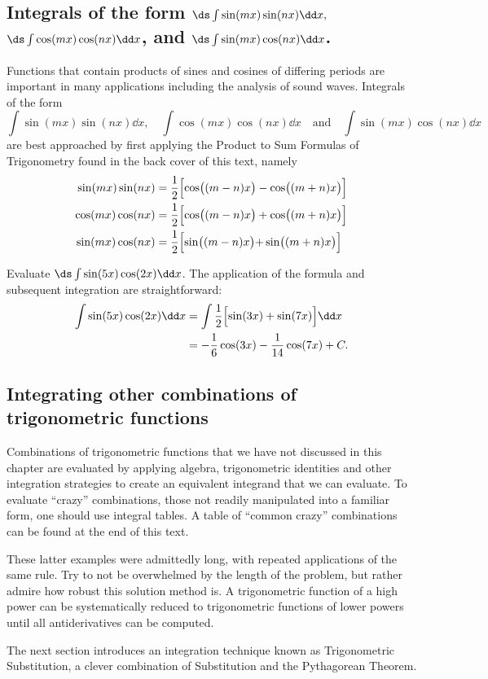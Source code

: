 \subsection{Integrals of the form \texorpdfstring{$\ds \int\sin(mx)\sin(nx)\dd x,$ $\ds\int \cos(mx)\cos(nx)\dd x$, and $\ds\int \sin(mx)\cos(nx)\dd x$.}{∫sin(mx)sin(nx)dx, ∫cos(mx)cos(nx)dx, and ∫sin(mx)cos(nx)dx}}

Functions that contain products of sines and cosines of differing periods are important in many applications including the analysis of sound waves. Integrals of the form 
\[
\int\sin(mx)\sin(nx)\dd x,\quad \int \cos(mx)\cos(nx)\dd x \quad \text{and}\quad\int \sin(mx)\cos(nx)\dd x
\]
are best approached by first applying the Product to Sum Formulas of Trigonometry found in the back cover of this text, namely
\begin{align*}
\sin(mx)\sin(nx) &= \frac12\Bigl[\cos\bigl((m-n)x\bigr)-\cos\bigl((m+n)x\bigr)\Bigr] \\
\cos(mx)\cos(nx) &= \frac12\Bigl[\cos\bigl((m-n)x\bigr)+\cos\bigl((m+n)x\bigr)\Bigr] \\
\sin(mx)\cos(nx) &=	\frac12\Bigl[\sin\bigl((m-n)x\bigl)+\sin\bigl((m+n)x\bigr)\Bigr]
\end{align*}

\begin{example}\label{ex_trigint4}
Evaluate $\ds\int\sin(5x)\cos(2x)\dd x$.
\solution
The application of the formula and subsequent integration are straightforward:
\begin{align*}
	\int\sin(5x)\cos(2x)\dd x
	&= \int \frac12\Bigl[\sin(3x)+\sin(7x)\Bigr]\dd x \\
	&= -\frac16\cos(3x) - \frac1{14}\cos(7x) + C.
\end{align*}
\end{example}

\subsection{Integrating other combinations of trigonometric functions}

Combinations of trigonometric functions that we have not discussed in this chapter are evaluated by applying algebra, trigonometric identities and other integration strategies to create an equivalent integrand that we can evaluate. To evaluate ``crazy'' combinations, those not readily manipulated into a familiar form, one should use integral tables. A table of ``common crazy'' combinations can be found at the end of this text.

These latter examples were admittedly long, with repeated applications of the same rule. Try to not be overwhelmed by the length of the problem, but rather admire how robust this solution method is. A trigonometric function of a high power can be systematically reduced to trigonometric functions of lower powers until all antiderivatives can be computed. 

The next section introduces an integration technique known as Trigonometric Substitution, a clever combination of Substitution and the Pythagorean Theorem.

